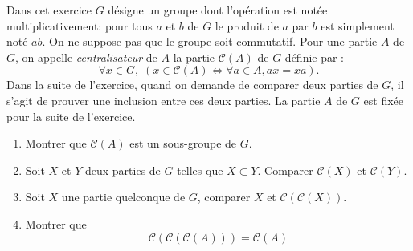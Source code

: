 Dans cet exercice $G$ désigne un groupe dont l'opération est notée multiplicativement: pour tous  $a$ et $b$ de $G$ le produit de $a$ par $b$ est simplement noté $ab$. On ne suppose pas que le groupe soit commutatif.\newline
Pour une partie $A$ de $G$, on appelle \emph{centralisateur} de $A$ la partie $\mathcal C(A)$ de $G$ définie par :
\begin{displaymath}
 \forall x \in G, \; \left( x\in \mathcal C(A) \Leftrightarrow \forall a \in A, ax =xa\right) .
\end{displaymath}
Dans la suite de l'exercice, quand on demande de comparer deux parties de $G$, il s'agit de prouver une inclusion entre ces deux parties.\newline
La partie $A$ de $G$ est fixée pour la suite de l'exercice.
\begin{enumerate}
 \item Montrer que $\mathcal C(A)$ est un sous-groupe de $G$.
 \item  Soit $X$ et $Y$ deux parties de $G$ telles que $X\subset Y$. Comparer $\mathcal C(X)$ et $\mathcal C(Y)$.
 \item Soit $X$ une partie quelconque de $G$, comparer $X$ et $\mathcal C(\mathcal C(X))$.
 \item Montrer que 
\begin{displaymath}
\mathcal C( \mathcal C(\mathcal C(A))) = \mathcal C(A)
\end{displaymath}
\end{enumerate}
